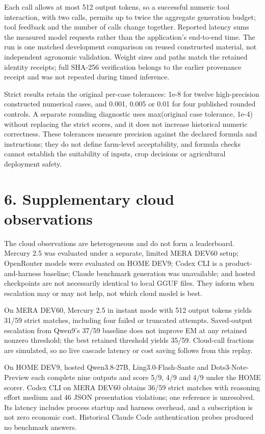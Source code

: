 \documentclass[10pt,a4paper]{article}
\begin{document}
Each call allows at most 512 output tokens, so a successful numeric tool interaction, with two calls, permits up to twice the aggregate generation budget; tool feedback and the number of calls change together. Reported latency sums the measured model requests rather than the application's end-to-end time. The run is one matched development comparison on reused constructed material, not independent agronomic validation. Weight sizes and paths match the retained identity receipts; full SHA-256 verification belongs to the earlier provenance receipt and was not repeated during timed inference.

Strict results retain the original per-case tolerances: 1e-8 for twelve high-precision constructed numerical cases, and 0.001, 0.005 or 0.01 for four published rounded controls. A separate rounding diagnostic uses max(original case tolerance, 1e-4) without replacing the strict scores, and it does not increase historical numeric correctness. These tolerances measure precision against the declared formula and instructions; they do not define farm-level acceptability, and formula checks cannot establish the suitability of inputs, crop decisions or agricultural deployment safety.

\section*{6. Supplementary cloud observations}
The cloud observations are heterogeneous and do not form a leaderboard. Mercury 2.5 was evaluated under a separate, limited MERA DEV60 setup; OpenRouter models were evaluated on HOME DEV9; Codex CLI is a product-and-harness baseline; Claude benchmark generation was unavailable; and hosted checkpoints are not necessarily identical to local GGUF files. They inform when escalation may or may not help, not which cloud model is best.

On MERA DEV60, Mercury 2.5 in instant mode with 512 output tokens yields 31/59 strict matches, including four failed or truncated attempts. Saved-output escalation from Qwen9's 37/59 baseline does not improve EM at any retained nonzero threshold; the best retained threshold yields 35/59. Cloud-call fractions are simulated, so no live cascade latency or cost saving follows from this replay.

On HOME DEV9, hosted Qwen3.8-27B, Ling3.0-Flash-Sante and Dots3-Note-Preview each complete nine outputs and score 5/9, 4/9 and 4/9 under the HOME scorer. Codex CLI on MERA DEV60 obtains 36/59 strict matches with reasoning effort medium and 46 JSON presentation violations; one reference is unresolved. Its latency includes process startup and harness overhead, and a subscription is not zero economic cost. Historical Claude Code authentication probes produced no benchmark answers.
\end{document}

